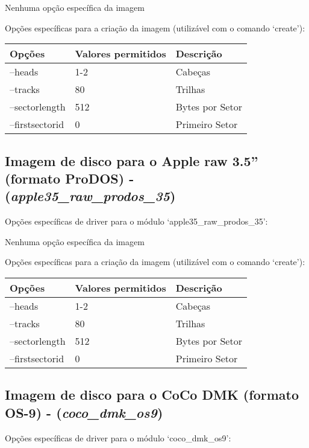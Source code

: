 \documentclass[letterpaper,10pt,brazil]{sphinxmanual}
\begin{document}
Nenhuma opção específica da imagem

Opções específicas para a criação da imagem (utilizável com o comando `create'):

\noindent\begin{tabulary}{\linewidth}{|L|L|L|}
\hline

Opções
&
Valores permitidos
&
Descrição
\\
\hline
--heads
&
1-2
&
Cabeças
\\
\hline
--tracks
&
80
&
Trilhas
\\
\hline
--sectorlength
&
512
&
Bytes por Setor
\\
\hline
--firstsectorid
&
0
&
Primeiro Setor
\\
\hline\end{tabulary}



\subsection{Imagem de disco para o Apple raw 3.5'' (formato ProDOS) - (\emph{apple35\_raw\_prodos\_35})}
\label{tools/imgtool:imagem-de-disco-para-o-apple-raw-3-5-formato-prodos-apple35-raw-prodos-35}
Opções específicas de driver para o módulo `apple35\_raw\_prodos\_35':

Nenhuma opção específica da imagem

Opções específicas para a criação da imagem (utilizável com o comando `create'):

\noindent\begin{tabulary}{\linewidth}{|L|L|L|}
\hline

Opções
&
Valores permitidos
&
Descrição
\\
\hline
--heads
&
1-2
&
Cabeças
\\
\hline
--tracks
&
80
&
Trilhas
\\
\hline
--sectorlength
&
512
&
Bytes por Setor
\\
\hline
--firstsectorid
&
0
&
Primeiro Setor
\\
\hline\end{tabulary}



\subsection{Imagem de disco para o CoCo DMK (formato OS-9) - (\emph{coco\_dmk\_os9})}
\label{tools/imgtool:imagem-de-disco-para-o-coco-dmk-formato-os-9-coco-dmk-os9}
Opções específicas de driver para o módulo `coco\_dmk\_os9':
\end{document}
